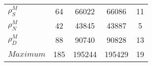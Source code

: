 \begin{center}
\begin{longtable}{lcccc}
$ {\rho^{M}_{S}}       $	 & 	                   64	 & 	                66022	 & 	                66086	 & 	                   11 \\ 
$ {\rho^{M}_{N}}       $	 & 	                   42	 & 	                43845	 & 	                43887	 & 	                    5 \\ 
$ {\rho^{M}_{D}}       $	 & 	                   88	 & 	                90740	 & 	                90828	 & 	                   13 \\ 
$Maximum               $	 & 	                  185	 & 	               195244	 & 	               195429	 & 	                   19 \\ 
\end{longtable}
 \end{center}

